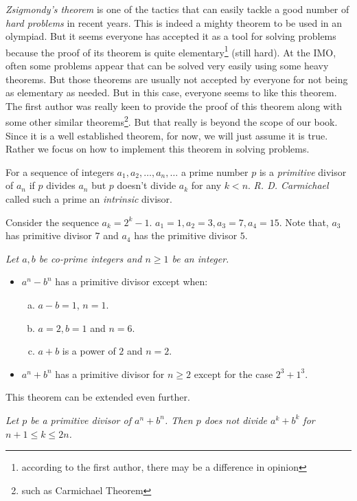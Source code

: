 \documentclass{subfile}
\begin{document}
	\textit{Zsigmondy's theorem} is one of the tactics that can easily tackle a good number of \textit{hard problems} in recent years. This is indeed a mighty theorem to be used in an olympiad. But it seems everyone has accepted it as a tool for solving problems because the proof of its theorem is quite elementary\footnote{according to the first author, there may be a difference in opinion} (still hard). At the IMO, often some problems appear that can be solved very easily using some heavy theorems. But those theorems are usually not accepted by everyone for not being as elementary as needed. But in this case, everyone seems to like this theorem. The first author was really keen to provide the proof of this theorem along with some other similar theorems\footnote{such as Carmichael Theorem}. But that really is beyond the scope of our book. Since it is a well established theorem, for now, we will just assume it is true. Rather we focus on how to implement this theorem in solving problems.
	
		\begin{definition}
			For a sequence of integers $a_1,a_2,\ldots,a_n,\ldots$ a prime number $p$ is a \textit{primitive} divisor of $a_n$ if $p$ divides $a_n$ but $p$ doesn't divide $a_k$ for any $k<n$. \textit{R. D. Carmichael} called such a prime an \textit{intrinsic} divisor.
		\end{definition}
		
		\begin{example}
			Consider the sequence $a_k=2^k-1$. $a_1=1,a_2=3,a_3=7,a_4=15$. Note that, $a_3$ has primitive divisor $7$ and $a_4$ has the primitive divisor $5$.
		\end{example}
		
		\begin{theorem}\slshape
			Let $a,b$ be co-prime integers and $n\geq1$ be an integer. 
				\begin{itemize}
					\item $a^n-b^n$ has a primitive divisor except when:
						\begin{enumerate}[(a)]
							\item $a-b=1$, $n=1$.
							\item $a=2,b=1$ and $n=6$.
							\item $a+b$ is a power of $2$ and $n=2$.
						\end{enumerate}
					\item $a^n+b^n$ has a primitive divisor for $n\geq2$ except for the case $2^3+1^3$.
				\end{itemize}\label{thm:zsigmondy}
		\end{theorem}
	This theorem can be extended even further.
		\begin{theorem}\slshape
			Let $p$ be a primitive divisor of $a^n+b^n$. Then $p$ does not divide $a^k+b^k$ for $n+1\leq k\leq2n$.
		\end{theorem}
		
\end{document}
